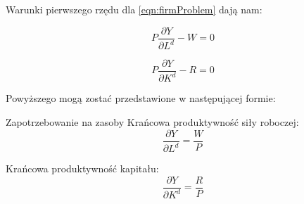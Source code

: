 Warunki pierwszego rzędu dla \ref{eqn:firmProblem} dają nam:

\begin{equation*}
    P\frac{\partial Y}{\partial L^d} - W = 0
\end{equation*}

\begin{equation*}
    P\frac{\partial Y}{\partial K^d} - R = 0
\end{equation*}

Powyższego mogą zostać przedstawione w następującej formie:

\begin{definition}{Zapotrzebowanie na zasoby}
    Krańcowa produktywność siły roboczej:
    \begin{equation*}
        \frac{\partial Y}{\partial L^d} = \frac{W}{P}
    \end{equation*}
    
    Krańcowa produktywność kapitału:
    \begin{equation*}
        \frac{\partial Y}{\partial K^d} = \frac{R}{P}
    \end{equation*}
\end{definition}









